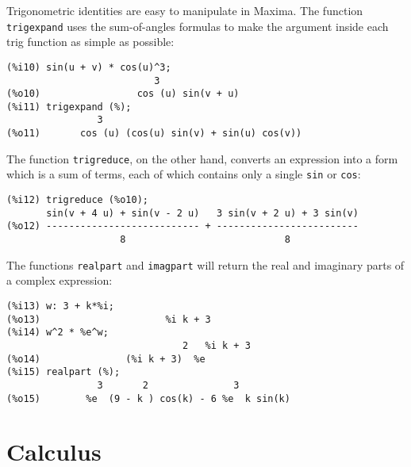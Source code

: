 \documentclass[a4paper,12pt]{article}
\begin{document}
Trigonometric identities are easy to manipulate in Maxima.  The
function {\tt trigexpand} uses the sum-of-angles formulas to make the
argument inside each trig function as simple as possible:
\begin{verbatim}
(%i10) sin(u + v) * cos(u)^3;
                          3
(%o10)                 cos (u) sin(v + u)
(%i11) trigexpand (%);
                3
(%o11)       cos (u) (cos(u) sin(v) + sin(u) cos(v))
\end{verbatim}
The function {\tt trigreduce}, on the other hand, converts an
expression into a form which is a sum of terms, each of which contains
only a single {\tt sin} or {\tt cos}:
\begin{verbatim}
(%i12) trigreduce (%o10);
       sin(v + 4 u) + sin(v - 2 u)   3 sin(v + 2 u) + 3 sin(v)
(%o12) --------------------------- + -------------------------
                    8                            8
\end{verbatim}
The functions {\tt realpart} and {\tt imagpart} will return the real
and imaginary parts of a complex expression:
\begin{verbatim}
(%i13) w: 3 + k*%i;
(%o13)                      %i k + 3
(%i14) w^2 * %e^w;
                               2   %i k + 3
(%o14)               (%i k + 3)  %e
(%i15) realpart (%);
                3       2               3
(%o15)        %e  (9 - k ) cos(k) - 6 %e  k sin(k)
\end{verbatim}

\section{Calculus \label{sec:calculus}}
\end{document}
